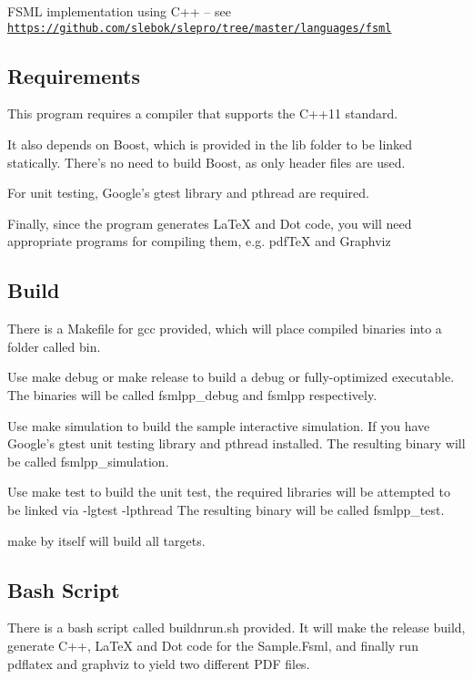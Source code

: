 F\-S\-M\-L implementation using C++ -- see \href{https://github.com/slebok/slepro/tree/master/languages/fsml}{\tt https\-://github.\-com/slebok/slepro/tree/master/languages/fsml}

\subsection*{Requirements}

This program requires a compiler that supports the C++11 standard.

It also depends on Boost, which is provided in the lib folder to be linked statically. There's no need to build Boost, as only header files are used.

For unit testing, Google's gtest library and pthread are required.

Finally, since the program generates La\-Te\-X and Dot code, you will need appropriate programs for compiling them, e.\-g. pdf\-Te\-X and Graphviz

\subsection*{Build}

There is a Makefile for gcc provided, which will place compiled binaries into a folder called bin.

Use {\ttfamily make debug} or {\ttfamily make release} to build a debug or fully-\/optimized executable. The binaries will be called {\ttfamily fsmlpp\-\_\-debug} and {\ttfamily fsmlpp} respectively.

Use {\ttfamily make simulation} to build the sample interactive simulation. If you have Google's gtest unit testing library and pthread installed. The resulting binary will be called {\ttfamily fsmlpp\-\_\-simulation}.

Use {\ttfamily make test} to build the unit test, the required libraries will be attempted to be linked via {\ttfamily -\/lgtest -\/lpthread} The resulting binary will be called {\ttfamily fsmlpp\-\_\-test}.

{\ttfamily make} by itself will build all targets.

\subsection*{Bash Script}

There is a bash script called {\ttfamily buildnrun.\-sh} provided. It will make the release build, generate C++, La\-Te\-X and Dot code for the Sample.\-Fsml, and finally run {\ttfamily pdflatex} and {\ttfamily graphviz} to yield two different P\-D\-F files.

